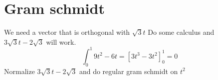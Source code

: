 \section{Gram schmidt}
We need a vector that is orthogonal with $\sqrt{3}t$ 
Do some calculus and $3\sqrt{3}t-2\sqrt{3}$ will work.
\[
    \int_0^1 9t^2 - 6t =
     \left[ 3t^3 - 3t^2\right]_0^1 = 0
\]
Normalize $3\sqrt{3}t-2\sqrt{3}$ and do regular gram schmidt on $t^2$
